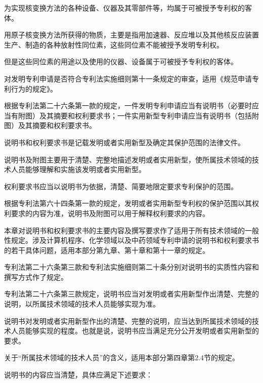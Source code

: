 为实现核变换方法的各种设备、仪器及其零部件等，均属于可被授予专利权的客体。

用原子核变换方法所获得的物质，主要是指用加速器、反应堆以及其他核反应装置生产、制造的各种放射性同位素，这些同位素不能被授予发明专利权。

但是这些同位素的用途以及使用的仪器、设备属于可被授予专利权的客体。

对发明专利申请是否符合专利法实施细则第十一条规定的审查，适用《规范申请专利行为的规定》。

根据专利法第二十六条第一款的规定，一件发明专利申请应当有说明书（必要时应当有附图）及其摘要和权利要求书；一件实用新型专利申请应当有说明书（包括附图）及其摘要和权利要求书。

说明书和权利要求书是记载发明或者实用新型及确定其保护范围的法律文件。

说明书及附图主要用于清楚、完整地描述发明或者实用新型，使所属技术领域的技术人员能够理解和实施该发明或者实用新型。

权利要求书应当以说明书为依据，清楚、简要地限定要求专利保护的范围。

根据专利法第六十四条第一款的规定，发明或者实用新型专利权的保护范围以其权利要求的内容为准，说明书及附图可以用于解释权利要求的内容。

本章对说明书和权利要求书的主要内容及撰写要求作了适用于所有技术领域的一般性规定。涉及计算机程序、化学领域以及中药领域专利申请的说明书和权利要求书的若干具体问题，适用本部分第九章、第十章和第十一章的规定。

专利法第二十六条第三款和专利法实施细则第二十条分别对说明书的实质性内容和撰写方式作了规定。

专利法第二十六条第三款规定，说明书应当对发明或者实用新型作出清楚、完整的说明，以所属技术领域的技术人员能够实现为准。

说明书对发明或者实用新型作出的清楚、完整的说明，应当达到所属技术领域的技术人员能够实现的程度。也就是说，说明书应当满足充分公开发明或者实用新型的要求。

关于“所属技术领域的技术人员”的含义，适用本部分第四章第2.4节的规定。

说明书的内容应当清楚，具体应满足下述要求：


